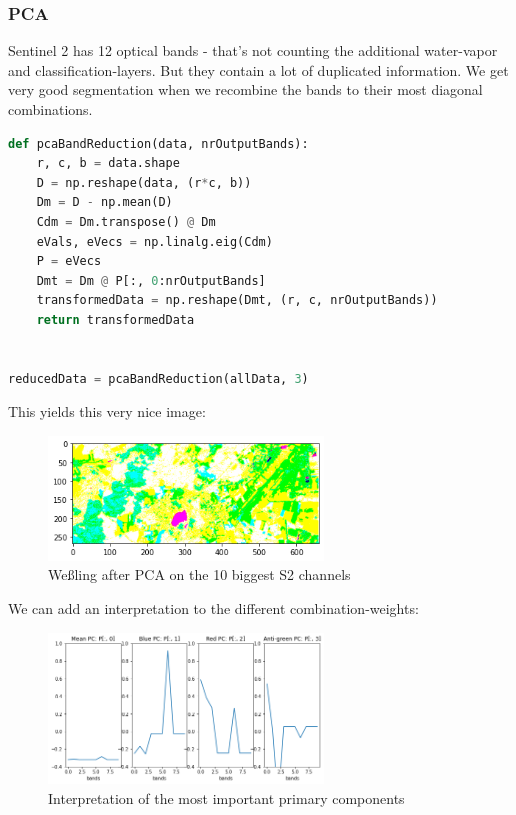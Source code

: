 \subsubsection{PCA}
Sentinel 2 has 12 optical bands - that's not counting the additional water-vapor and classification-layers.
But they contain a lot of duplicated information.
We get very good segmentation when we recombine the bands to their most diagonal combinations.

\begin{lstlisting}[language=python]
def pcaBandReduction(data, nrOutputBands):
    r, c, b = data.shape
    D = np.reshape(data, (r*c, b))
    Dm = D - np.mean(D)
    Cdm = Dm.transpose() @ Dm
    eVals, eVecs = np.linalg.eig(Cdm)
    P = eVecs
    Dmt = Dm @ P[:, 0:nrOutputBands]
    transformedData = np.reshape(Dmt, (r, c, nrOutputBands))
    return transformedData


reducedData = pcaBandReduction(allData, 3)
\end{lstlisting}

This yields this very nice image:
\begin{figure}[H]
    \caption{Weßling after PCA on the 10 biggest S2 channels}
    \centering
      \includegraphics[width=0.65\textwidth]{images/pca_wessling.png}
\end{figure}

We can add an interpretation to the different combination-weights:
\begin{figure}[H]
    \caption{Interpretation of the most important primary components}
    \centering
      \includegraphics[width=0.65\textwidth]{images/pca_wessling_pcs.png}
\end{figure}




